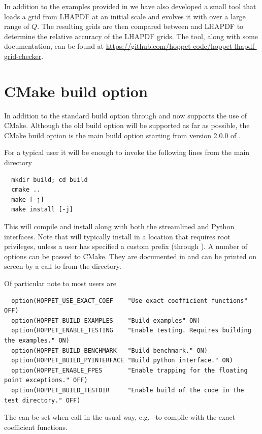 In addition to the examples provided in
 we have also developed a small tool that loads a grid from LHAPDF at an initial scale and evolves it with \hoppet{} over a large range of $Q$. The resulting grids are then compared between \hoppet{} and LHAPDF to determine the relative accuracy of the LHAPDF grids. The tool, along with some documentation, can be found at \href{https://github.com/hoppet-code/hoppet-lhapdf-grid-checker}{https://github.com/hoppet-code/hoppet-lhapdf-grid-checker}.

\section{CMake build option}
\label{sec:cmake}
In addition to the standard build option through  and
 \hoppet now supports the use of CMake. Although
the old build option will be supported as far as possible, the CMake
build option is the main build option starting from version
2.0.0 of \hoppet.

For a typical user it will be enough to invoke the following lines
from the main directory
\begin{lstlisting}
  mkdir build; cd build
  cmake ..
  make [-j]
  make install [-j]
\end{lstlisting}
This will compile and install \hoppet along with both the streamlined
and Python interfaces. Note that  will typically
install in a location that requires root privileges, unless a user has
specified a custom prefix (through
). A number of options can
be passed to CMake. They are documented in
 and can be printed on screen
by a call to  from the  directory.

Of particular note to most users are
\begin{lstlisting}
  option(HOPPET_USE_EXACT_COEF    "Use exact coefficient functions"  OFF)
  option(HOPPET_BUILD_EXAMPLES    "Build examples" ON)
  option(HOPPET_ENABLE_TESTING    "Enable testing. Requires building the examples." ON)
  option(HOPPET_BUILD_BENCHMARK   "Build benchmark." ON)
  option(HOPPET_BUILD_PYINTERFACE "Build python interface." ON)
  option(HOPPET_ENABLE_FPES       "Enable trapping for the floating point exceptions." OFF)
  option(HOPPET_BUILD_TESTDIR     "Enable build of the code in the test directory." OFF)
\end{lstlisting}
The can be set when call  in the usual way,
e.g.\  to compile \hoppet
with the exact coefficient functions.

